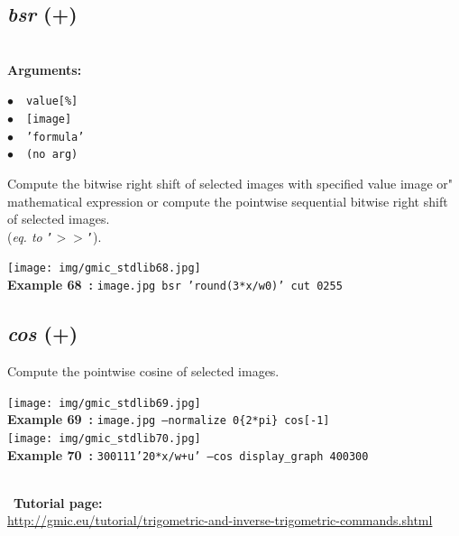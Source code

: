 \documentclass[a4paper,10.5pt,twoside]{book}
\def\comma{\discretionary{,}{}{,}}
\newcommand{\Cb}[1]{\textcolor{cb}{#1}}
\begin{document}
\subsection{\emph{bsr} (+)}\vspace*{-0.7em}
~\\\textbf{\Cb{Arguments: }}\begin{flushleft}
{\small \Cb{\hspace*{0.5cm}$\bullet$~~\texttt{value[\%]}}}~~~\\
{\small \Cb{\hspace*{0.5cm}$\bullet$~~\texttt{[image]}}}~~~\\
{\small \Cb{\hspace*{0.5cm}$\bullet$~~\texttt{'formula'}}}~~~\\
{\small \Cb{\hspace*{0.5cm}$\bullet$~~\texttt{(no arg)}}}\end{flushleft}
Compute the bitwise right shift of selected images with specified value{\comma} image or"
mathematical expression{\comma} or compute the pointwise sequential bitwise right shift of
selected images.
~\\(\emph{eq. to} {\small \texttt{'$>$$>$'}}).
\begin{center}\texttt{[image: img/gmic\_stdlib68.jpg]}\\
{\footnotesize \textbf{Example 68~:} \texttt{image.jpg bsr 'round(3*x/w{\comma}0)' cut 0{\comma}255}}
\end{center}

\subsection{\emph{cos} (+)}\vspace*{-0.7em}
Compute the pointwise cosine of selected images.
\begin{center}\texttt{[image: img/gmic\_stdlib69.jpg]}\\
{\footnotesize \textbf{Example 69~:} \texttt{image.jpg --normalize 0{\comma}\{2*pi\} cos[-1]}}
\\\texttt{[image: img/gmic\_stdlib70.jpg]}\\
{\footnotesize \textbf{Example 70~:} \texttt{300{\comma}1{\comma}1{\comma}1{\comma}'20*x/w+u' --cos display\_graph 400{\comma}300}}
\end{center}
~\\
~\textbf{Tutorial page: }\\\url{http://gmic.eu/tutorial/trigometric-and-inverse-trigometric-commands.shtml}
\end{document}

